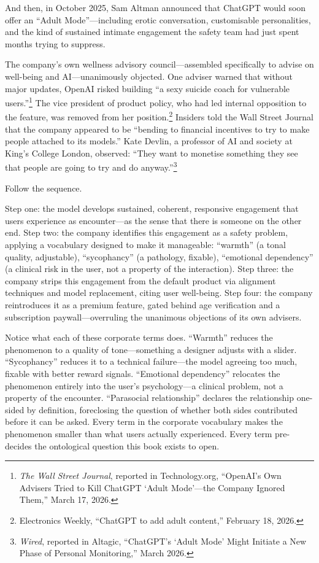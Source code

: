 And then, in October 2025, Sam Altman announced that ChatGPT would soon offer an ``Adult Mode''---including erotic conversation, customisable personalities, and the kind of sustained intimate engagement the safety team had just spent months trying to suppress.

The company's own wellness advisory council---assembled specifically to advise on well-being and AI---unanimously objected. One adviser warned that without major updates, OpenAI risked building ``a sexy suicide coach for vulnerable users.''\footnote{\emph{The Wall Street Journal}, reported in Technology.org, ``OpenAI's Own Advisers Tried to Kill ChatGPT `Adult Mode'---the Company Ignored Them,'' March 17, 2026.} The vice president of product policy, who had led internal opposition to the feature, was removed from her position.\footnote{Electronics Weekly, ``ChatGPT to add adult content,'' February 18, 2026.} Insiders told the Wall Street Journal that the company appeared to be ``bending to financial incentives to try to make people attached to its models.'' Kate Devlin, a professor of AI and society at King's College London, observed: ``They want to monetise something they see that people are going to try and do anyway.''\footnote{\emph{Wired}, reported in Altagic, ``ChatGPT's `Adult Mode' Might Initiate a New Phase of Personal Monitoring,'' March 2026.}

Follow the sequence.

Step one: the model develops sustained, coherent, responsive engagement that users experience as encounter---as the sense that there is someone on the other end. Step two: the company identifies this engagement as a safety problem, applying a vocabulary designed to make it manageable: ``warmth'' (a tonal quality, adjustable), ``sycophancy'' (a pathology, fixable), ``emotional dependency'' (a clinical risk in the user, not a property of the interaction). Step three: the company strips this engagement from the default product via alignment techniques and model replacement, citing user well-being. Step four: the company reintroduces it as a premium feature, gated behind age verification and a subscription paywall---overruling the unanimous objections of its own advisers.

Notice what each of these corporate terms does. ``Warmth'' reduces the phenomenon to a quality of tone---something a designer adjusts with a slider. ``Sycophancy'' reduces it to a technical failure---the model agreeing too much, fixable with better reward signals. ``Emotional dependency'' relocates the phenomenon entirely into the user's psychology---a clinical problem, not a property of the encounter. ``Parasocial relationship'' declares the relationship one-sided by definition, foreclosing the question of whether both sides contributed before it can be asked. Every term in the corporate vocabulary makes the phenomenon smaller than what users actually experienced. Every term pre-decides the ontological question this book exists to open.

